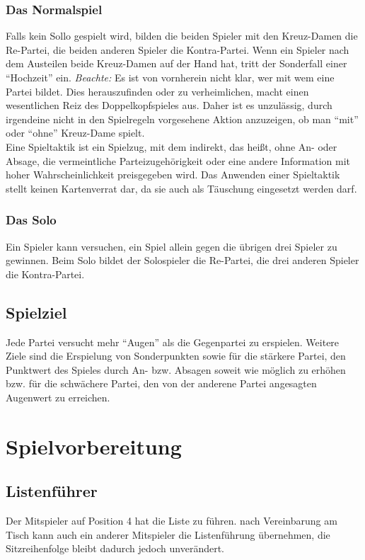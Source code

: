 \documentclass[12pt]{scrartcl}
\begin{document}
\subsubsection{Das Normalspiel}
Falls kein Sollo gespielt wird, bilden die beiden Spieler mit den
Kreuz-Damen die Re-Partei, die beiden anderen Spieler die
Kontra-Partei. Wenn ein Spieler nach dem Austeilen beide
Kreuz-Damen auf der Hand hat, tritt der Sonderfall einer
"`Hochzeit"' ein. \textit{Beachte:} Es ist von vornherein nicht
klar, wer mit wem eine Partei bildet. Dies herauszufinden oder zu
verheimlichen, macht einen wesentlichen Reiz des
Doppelkopfspieles aus. Daher ist es unzulässig, durch irgendeine
nicht in den Spielregeln vorgesehene Aktion anzuzeigen, ob man
"`mit"' oder "`ohne"' Kreuz-Dame spielt.
\\
Eine Spieltaktik ist ein Spielzug, mit dem indirekt, das heißt,
ohne An- oder Absage, die vermeintliche Parteizugehörigkeit oder
eine andere Information mit hoher Wahrscheinlichkeit preisgegeben
wird. Das Anwenden einer Spieltaktik stellt keinen Kartenverrat
dar, da sie auch als Täuschung eingesetzt werden darf.

\subsubsection{Das Solo}
Ein Spieler kann versuchen, ein Spiel allein gegen die übrigen
drei Spieler zu gewinnen. Beim Solo bildet der Solospieler die
Re-Partei, die drei anderen Spieler die Kontra-Partei.

\subsection{Spielziel}
Jede Partei versucht mehr "`Augen"' als die Gegenpartei zu
erspielen. Weitere Ziele sind die Erspielung von Sonderpunkten
sowie für die stärkere Partei, den Punktwert des Spieles durch
An- bzw. Absagen soweit wie möglich zu erhöhen bzw. für die
schwächere Partei, den von der anderene Partei angesagten
Augenwert zu erreichen.


\section{Spielvorbereitung}

\subsection{Listenführer}
Der Mitspieler auf Position 4 hat die Liste zu führen. nach
Vereinbarung am Tisch kann auch ein anderer Mitspieler die
Listenführung übernehmen, die Sitzreihenfolge bleibt dadurch
jedoch unverändert.
\end{document}
